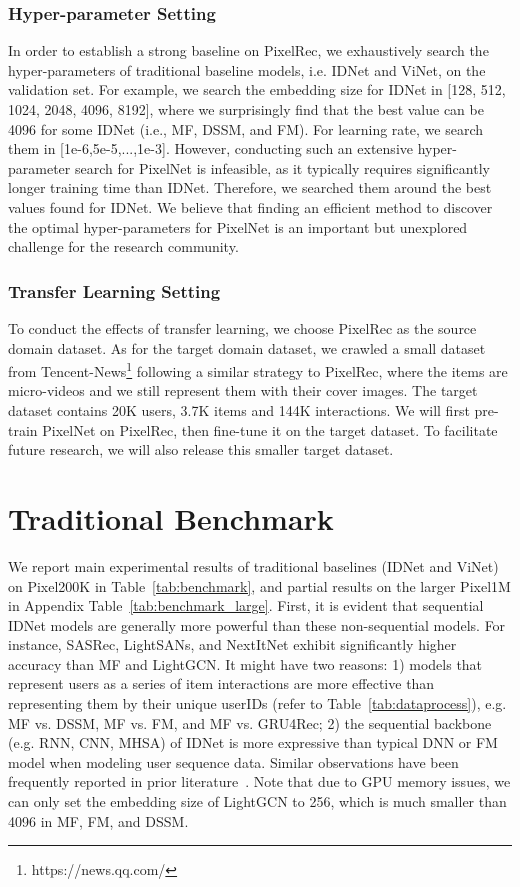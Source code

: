\documentclass[sigconf]{acmart}
\begin{document}
\subsubsection{Hyper-parameter Setting}
In order to establish a strong baseline on PixelRec, we exhaustively search the hyper-parameters of traditional baseline models, i.e. IDNet and ViNet,  on the validation set. For example, we search the embedding size  for IDNet in  [128, 512, 1024, 2048, 4096, 8192], where we surprisingly find that 
the best value can be 4096 for some IDNet (i.e., MF, DSSM, and FM).
For learning rate,  we search them in [1e-6,5e-5,...,1e-3]. 
However, conducting such an extensive hyper-parameter search for PixelNet is infeasible, as it typically requires significantly longer training time than IDNet. Therefore, we searched them around the best values found for IDNet. We believe that finding an efficient method to discover the optimal hyper-parameters for PixelNet is an important but unexplored challenge for the research community.


\subsubsection{Transfer Learning Setting}
To conduct the effects of transfer learning, we choose PixelRec  as the source domain dataset. As for the target domain dataset, we crawled a small dataset from Tencent-News\footnote{https://news.qq.com/} following a similar strategy to PixelRec, where the items are micro-videos and we still represent them with their cover images. The target dataset contains 20K  users, 3.7K items and 144K interactions. We will first pre-train PixelNet on PixelRec, then fine-tune it on the target dataset. To facilitate  future research, we will also release this smaller target dataset.


\section{Traditional Benchmark}
\label{TraditionalBenchmark}

We report main experimental results of traditional baselines (IDNet and ViNet) on Pixel200K in Table~\ref{tab:benchmark}, and partial results on the larger Pixel1M in Appendix Table~\ref{tab:benchmark_large}.
First,  it is evident that sequential IDNet models are generally more powerful than these non-sequential models. For instance, SASRec, LightSANs, and NextItNet exhibit significantly higher accuracy than MF and LightGCN. 
It might have two reasons: 1) models that represent users as  a series of item interactions are more effective than   representing them by their unique userIDs (refer to Table~\ref{tab:dataprocess}), e.g. MF vs. DSSM, MF vs. FM, and MF vs. GRU4Rec;
2) the sequential  backbone (e.g. RNN, CNN, MHSA) of IDNet is more expressive than typical DNN or FM model when modeling  user sequence data. Similar observations have been frequently reported  in  prior literature~\cite{kang2018self,sun2019bert4rec}.  Note that due to GPU memory issues, we can only set the  embedding size of LightGCN to 256, which is much smaller than 4096 in MF, FM, and DSSM.
\end{document}
